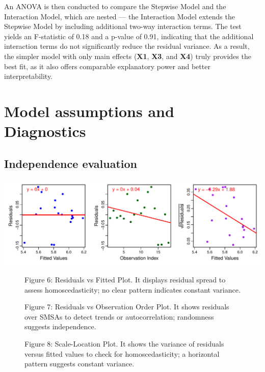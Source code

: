 \documentclass[
  12pt,
]{article}
\begin{document}
An ANOVA is then conducted to compare the Stepwise Model and the
Interaction Model, which are nested --- the Interaction Model extends
the Stepwise Model by including additional two-way interaction terms.
The test yields an F-statistic of 0.18 and a p-value of 0.91, indicating
that the additional interaction terms do not significantly reduce the
residual variance. As a result, the simpler model with only main effects
(\textbf{X1}, \textbf{X3}, and \textbf{X4}) truly provides the best fit,
as it also offers comparable explanatory power and better
interpretability.

\section{Model assumptions and
Diagnostics}\label{model-assumptions-and-diagnostics}

\subsection{Independence evaluation}\label{independence-evaluation}

\includegraphics{report1_r1_files/figure-latex/unnamed-chunk-11-1.pdf}

\begin{figure}[htbp]
\vspace{-1em}
  \centering
  \begin{minipage}[b]{0.3\linewidth}
    {\fontsize{12}{14}\selectfont Figure 6: Residuals vs Fitted Plot. It displays residual spread to assess homoscedasticity; no clear pattern indicates constant variance.\par}
  \end{minipage}
  \hfill
  \begin{minipage}[b]{0.3\linewidth}
    {\fontsize{12}{14}\selectfont Figure 7: Residuals vs Observation Order Plot. It shows residuals over SMSAs to detect trends or autocorrelation; randomness suggests independence.\par}
  \end{minipage}
  \hfill
  \begin{minipage}[b]{0.3\linewidth}
    {\fontsize{12}{14}\selectfont Figure 8: Scale-Location Plot. It shows the variance of residuals versus fitted values to check for homoscedasticity; a horizontal pattern suggests constant variance.\par}
  \end{minipage}
\end{figure}
\end{document}
